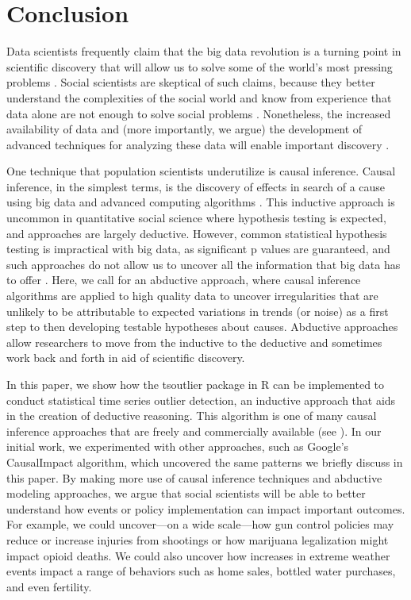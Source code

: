 \documentclass[12pt]{article}
\begin{document}
\hypertarget{conclusion}{%
\section{Conclusion}\label{conclusion}}

Data scientists frequently claim that the big data revolution is a
turning point in scientific discovery that will allow us to solve some
of the world's most pressing problems \citep{grimmer2015ppsp}. Social
scientists are skeptical of such claims, because they better understand
the complexities of the social world and know from experience that data
alone are not enough to solve social problems
\citep{bohon2018demography, grimmer2015ppsp}. Nonetheless, the increased
availability of data and (more importantly, we argue) the development of
advanced techniques for analyzing these data will enable important
discovery \citep{monroe2015no}.

One technique that population scientists underutilize is causal
inference. Causal inference, in the simplest terms, is the discovery of
effects in search of a cause using big data and advanced computing
algorithms \citep{imai2008misunderstandings}. This inductive approach is
uncommon in quantitative social science where hypothesis testing is
expected, and approaches are largely deductive. However, common
statistical hypothesis testing is impractical with big data, as
significant p values are guaranteed, and such approaches do not allow us
to uncover all the information that big data has to offer
\citep{monroe2015no}. Here, we call for an abductive approach, where
causal inference algorithms are applied to high quality data to uncover
irregularities that are unlikely to be attributable to expected
variations in trends (or noise) as a first step to then developing
testable hypotheses about causes. Abductive approaches allow researchers
to move from the inductive to the deductive and sometimes work back and
forth in aid of scientific discovery.

In this paper, we show how the tsoutlier package in R can be implemented
to conduct statistical time series outlier detection, an inductive
approach that aids in the creation of deductive reasoning. This
algorithm is one of many causal inference approaches that are freely and
commercially available (see \citet{rcausalimpact}). In our initial work,
we experimented with other approaches, such as Google's CausalImpact
algorithm, which uncovered the same patterns we briefly discuss in this
paper. By making more use of causal inference techniques and abductive
modeling approaches, we argue that social scientists will be able to
better understand how events or policy implementation can impact
important outcomes. For example, we could uncover---on a wide
scale---how gun control policies may reduce or increase injuries from
shootings or how marijuana legalization might impact opioid deaths. We
could also uncover how increases in extreme weather events impact a
range of behaviors such as home sales, bottled water purchases, and even
fertility.
\end{document}

